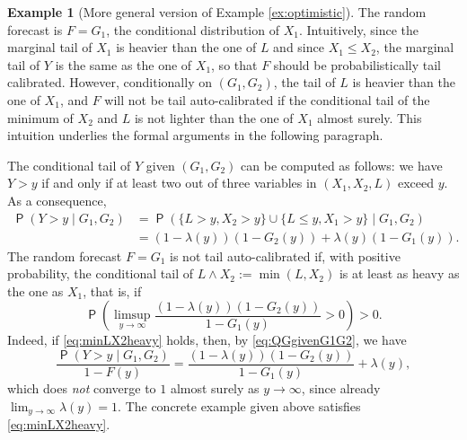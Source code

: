 \documentclass[12pt]{article}
\newcommand{\Q}{\operatorname{\mathsf{P}}}
\newcommand{\1}{\mathbf{1}} %
\theoremstyle{definition}
\newtheorem{example}[propo]{Example}
\begin{document}
\begin{example}[More general version of Example \ref{ex:optimistic}]
The random forecast is $F = G_1$, the conditional distribution of $X_1$. Intuitively, since the marginal tail of $X_1$ is heavier than the one of $L$ and since $X_1 \le X_2$, the marginal tail of $Y$ is the same as the one of $X_1$, so that $F$ should be probabilistically tail calibrated. However, conditionally on $(G_1,G_2)$, the tail of $L$ is heavier than the one of $X_1$, and $F$ will not be tail auto-calibrated if the conditional tail of the minimum of $X_2$ and $L$ is not lighter than the one of $X_1$ almost surely. This intuition underlies the formal arguments in the following paragraph.

The conditional tail of $Y$ given $(G_1,G_2)$ can be computed as follows: we have $Y > y$ if and only if at least two out of three variables in $(X_1,X_2,L)$ exceed $y$. As a consequence,
\begin{align}
\nonumber
	\Q(Y > y \mid G_1, G_2)
	&= \Q \left(
		\{L > y, X_2 > y\} \cup \{L \le y, X_1 > y\} 
		\mid G_1, G_2
	\right) \\
\label{eq:QGgivenG1G2}
	&= \left(1-\lambda(y)\right) \left(1-G_2(y)\right)
	+ \lambda(y) \left(1-G_1(y)\right).
\end{align}
The random forecast $F = G_1$ is not tail auto-calibrated if, with positive probability, the conditional tail of $L \wedge X_2 := \min(L, X_2)$ is at least as heavy as the one as $X_1$, that is, if
\begin{equation}
\label{eq:minLX2heavy}
	\Q \left( 
		\limsup_{y \to \infty} 
		\frac{(1 - \lambda(y))(1-G_2(y))}{1-G_1(y)} 
		> 0 
	\right) > 0. 
\end{equation}
Indeed, if \eqref{eq:minLX2heavy} holds, then, by \eqref{eq:QGgivenG1G2}, we have
\[
	\frac{\Q(Y > y \mid G_1, G_2)}{1-F(y)}
	= \frac{(1 - \lambda(y))(1-G_2(y))}{1-G_1(y)} 
	+ \lambda(y),
\]
which does \emph{not} converge to $1$ almost surely as $y \to \infty$, since already $\lim_{y \to \infty} \lambda(y) = 1$. The concrete example given above satisfies \eqref{eq:minLX2heavy}. 


\end{example}
\end{document}
